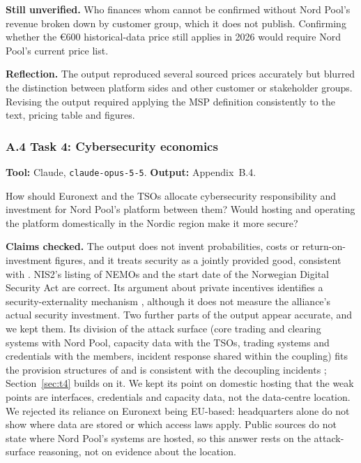 \textbf{Still unverified.} Who finances whom cannot be
confirmed without Nord Pool's revenue broken down by
customer group, which it does not publish. Confirming
whether the €600 historical-data price still applies in 2026
would require Nord Pool's current price list.

\textbf{Reflection.}
The output reproduced several sourced prices accurately
but blurred the distinction between platform sides
and other customer or stakeholder groups.
Revising the output required applying the MSP definition
consistently to the text, pricing table and figures.

\subsubsection*{A.4 Task 4: Cybersecurity economics}

\textbf{Tool:} Claude, \texttt{claude-opus-5-5}.
\quad \textbf{Output:} Appendix~B.4.

\begin{promptbox}
How should Euronext and the TSOs allocate cybersecurity
responsibility and investment for Nord Pool's platform
between them? Would hosting and operating the platform
domestically in the Nordic region make it more secure?
\end{promptbox}

\textbf{Claims checked.}
The output does not invent probabilities, costs
or return-on-investment figures, and it treats security
as a jointly provided good, consistent with
\citet{Kianpour2022}.
NIS2's listing of NEMOs \citep{NIS2}
and the start date of the Norwegian Digital Security Act
\citep{Regjeringen2025} are correct.
Its argument about private incentives identifies
a security-externality mechanism
\citep{AndersonMoore2006}, although it does not measure
the alliance's actual security investment.
Two further parts of the output appear accurate, and we
kept them. Its division of the attack surface (core trading
and clearing systems with Nord Pool, capacity data with the
TSOs, trading systems and credentials with the members,
incident response shared within the coupling) fits the
provision structures of \citet{Hirshleifer1983} and is
consistent with the decoupling incidents
\citep{NPIncident2019,SDAC2021}; Section~\ref{sec:t4}
builds on it. We kept its point on domestic hosting that the weak points
are interfaces, credentials and capacity data, not the
data-centre location. We rejected its reliance on Euronext
being EU-based: headquarters alone do not show where data
are stored or which access laws apply. Public sources do not
state where Nord Pool's systems are hosted, so this answer
rests on the attack-surface reasoning, not on evidence about
the location.

